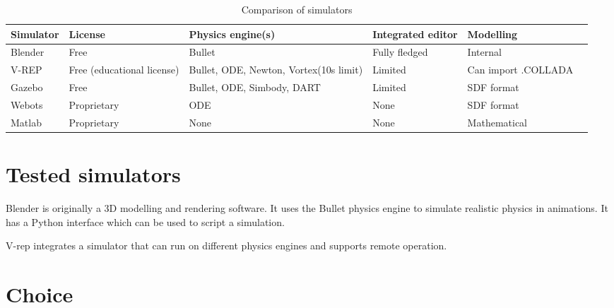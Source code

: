 \begin{table}[htp]
\center
\begin{tabularx}{\textwidth}{@{} l l X X X X @{}}
\toprule
\textbf{Simulator} & \textbf{License} & \textbf{Physics engine(s)} & \textbf{Integrated editor} & \textbf{Modelling}\\ 
\midrule
Blender & Free & Bullet & Fully fledged & Internal\\ 

V-REP & Free (educational license) & Bullet, ODE, Newton, Vortex(10s limit) & Limited & Can import .COLLADA\\

Gazebo & Free & Bullet, ODE, Simbody, DART & Limited & SDF format\\

Webots & Proprietary & ODE & None & SDF format\\

Matlab & Proprietary & None & None & Mathematical\\
\bottomrule
\end{tabularx}
\caption{Comparison of simulators }
\label{table:simulators_comp}
\end{table}

\section{Tested simulators}
Blender is originally a 3D modelling and rendering software. It uses the Bullet physics engine to simulate realistic physics in animations. It has a Python interface which can be used to script a simulation.

V-rep integrates a simulator that can run on different physics engines and supports remote operation. 

\section{Choice}

